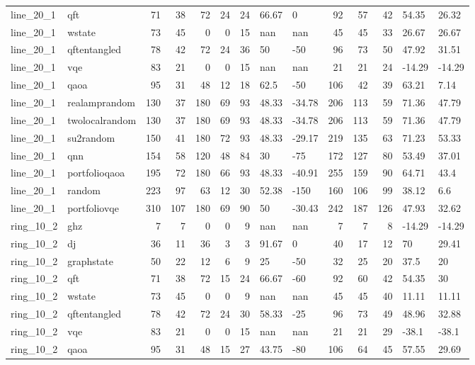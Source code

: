 \begin{longtable}{llrrrrrllrrrll}
line\_20\_1 & qft & 71 & 38 & 72 & 24 & 24 & 66.67 & 0 & 92 & 57 & 42 & 54.35 & 26.32 \\
line\_20\_1 & wstate & 73 & 45 & 0 & 0 & 15 & nan & nan & 45 & 45 & 33 & 26.67 & 26.67 \\
line\_20\_1 & qftentangled & 78 & 42 & 72 & 24 & 36 & 50 & -50 & 96 & 73 & 50 & 47.92 & 31.51 \\
line\_20\_1 & vqe & 83 & 21 & 0 & 0 & 15 & nan & nan & 21 & 21 & 24 & -14.29 & -14.29 \\
line\_20\_1 & qaoa & 95 & 31 & 48 & 12 & 18 & 62.5 & -50 & 106 & 42 & 39 & 63.21 & 7.14 \\
line\_20\_1 & realamprandom & 130 & 37 & 180 & 69 & 93 & 48.33 & -34.78 & 206 & 113 & 59 & 71.36 & 47.79 \\
line\_20\_1 & twolocalrandom & 130 & 37 & 180 & 69 & 93 & 48.33 & -34.78 & 206 & 113 & 59 & 71.36 & 47.79 \\
line\_20\_1 & su2random & 150 & 41 & 180 & 72 & 93 & 48.33 & -29.17 & 219 & 135 & 63 & 71.23 & 53.33 \\
line\_20\_1 & qnn & 154 & 58 & 120 & 48 & 84 & 30 & -75 & 172 & 127 & 80 & 53.49 & 37.01 \\
line\_20\_1 & portfolioqaoa & 195 & 72 & 180 & 66 & 93 & 48.33 & -40.91 & 255 & 159 & 90 & 64.71 & 43.4 \\
line\_20\_1 & random & 223 & 97 & 63 & 12 & 30 & 52.38 & -150 & 160 & 106 & 99 & 38.12 & 6.6 \\
line\_20\_1 & portfoliovqe & 310 & 107 & 180 & 69 & 90 & 50 & -30.43 & 242 & 187 & 126 & 47.93 & 32.62 \\
ring\_10\_2 & ghz & 7 & 7 & 0 & 0 & 9 & nan & nan & 7 & 7 & 8 & -14.29 & -14.29 \\
ring\_10\_2 & dj & 36 & 11 & 36 & 3 & 3 & 91.67 & 0 & 40 & 17 & 12 & 70 & 29.41 \\
ring\_10\_2 & graphstate & 50 & 22 & 12 & 6 & 9 & 25 & -50 & 32 & 25 & 20 & 37.5 & 20 \\
ring\_10\_2 & qft & 71 & 38 & 72 & 15 & 24 & 66.67 & -60 & 92 & 60 & 42 & 54.35 & 30 \\
ring\_10\_2 & wstate & 73 & 45 & 0 & 0 & 9 & nan & nan & 45 & 45 & 40 & 11.11 & 11.11 \\
ring\_10\_2 & qftentangled & 78 & 42 & 72 & 24 & 30 & 58.33 & -25 & 96 & 73 & 49 & 48.96 & 32.88 \\
ring\_10\_2 & vqe & 83 & 21 & 0 & 0 & 15 & nan & nan & 21 & 21 & 29 & -38.1 & -38.1 \\
ring\_10\_2 & qaoa & 95 & 31 & 48 & 15 & 27 & 43.75 & -80 & 106 & 64 & 45 & 57.55 & 29.69 \\

\end{longtable}
